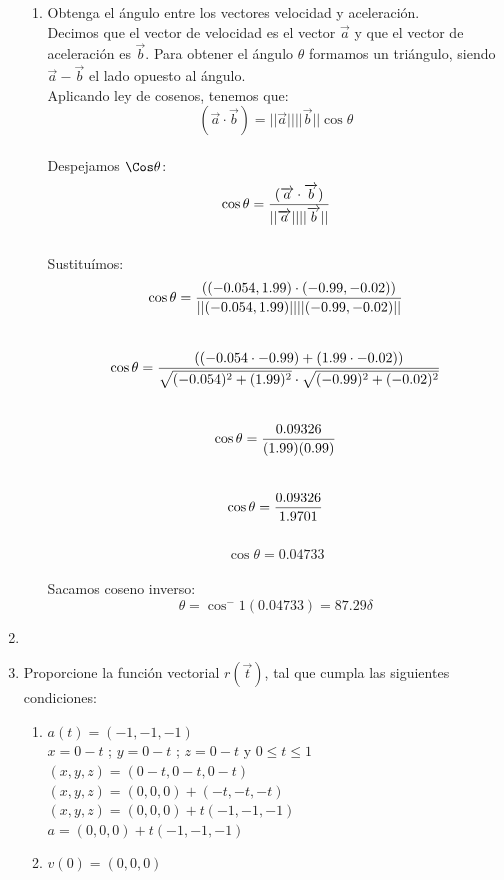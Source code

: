 \documentclass[10pt,letterpaper,fleqn]{article}
\begin{document}
\begin{enumerate}
\begin{enumerate}
            \item Obtenga el ángulo entre los vectores velocidad y aceleración.
            \\ Decimos que el vector de velocidad es el vector $\overrightarrow{a}$ y que el vector de aceleración es $\overrightarrow{b}$. Para obtener el ángulo $\theta$ formamos un triángulo, siendo $\overrightarrow{a}-\overrightarrow{b}$ el lado opuesto al ángulo.
            \\ Aplicando ley de cosenos, tenemos que: \\
            $$(\overrightarrow{a} \cdot \overrightarrow{b})=||\overrightarrow{a}|| ||\overrightarrow{b}|| \cos \theta $$ \\
            Despejamos $\Cos \theta$: \\
            $$\cos \theta = {(\overrightarrow{a} \cdot \overrightarrow{b}) \over ||\overrightarrow{a}|| ||\overrightarrow{b}||}$$ \\ 
            Sustituímos: \\
            $$\cos \theta = {((-0.054,1.99) \cdot (-0.99,-0.02)) \over ||(-0.054,1.99)|| ||(-0.99,-0.02)||}$$ \\
            $$\cos \theta = {((-0.054 \cdot-0.99) + (1.99 \cdot -0.02)) \over \sqrt{(-0.054)^2 + (1.99)^2} \cdot \sqrt{(-0.99)^2 + (-0.02)^2}}$$ \\
            $$\cos \theta = {0.09326 \over (1.99)(0.99)}$$ \\
            $$\cos \theta = {0.09326 \over 1.9701}$$ \\
            $$\cos \theta = {0.04733}$$ \\
            Sacamos coseno inverso: \\
            $$\theta = \cos^-1 (0.04733) = 87.29 \delta$$

        \end{enumerate}


        \item

        \item Proporcione la función vectorial $r(\overrightarrow{t})$, tal que cumpla las siguientes condiciones:
        \begin{enumerate}
            \item $a(t)=(-1,-1,-1)$ \\
            $x = 0-t$ ; $y = 0-t$ ; $ z = 0-t$ y $0 \leqslant t \leqslant 1$\\
            $(x,y,z)=(0-t,0-t,0-t)$ \\
            $(x,y,z)=(0,0,0)+(-t,-t,-t)$ \\
            $(x,y,z)=(0,0,0)+t(-1,-1,-1)$ \\
            $a=(0,0,0)+t(-1,-1,-1)$ 
            \item $v(0)=(0,0,0)$


\end{enumerate}
\end{enumerate}
\end{document}
